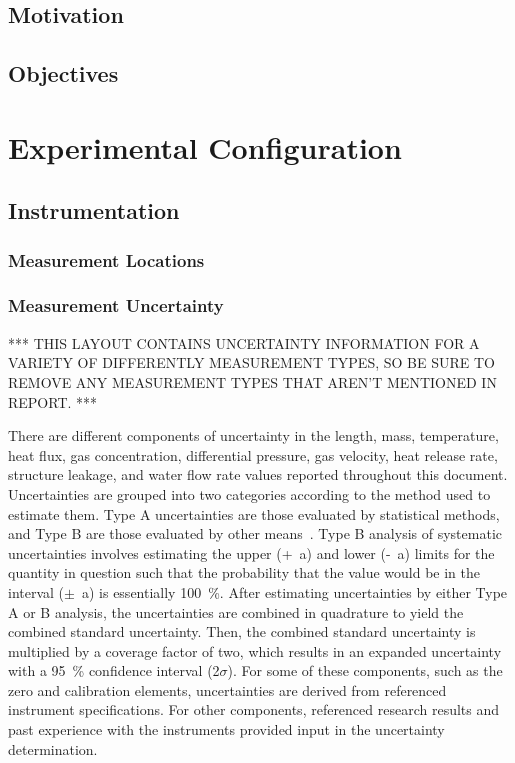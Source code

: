 \documentclass[12pt,oneside]{book}
\begin{document}
\section{Motivation}

\section{Objectives}


\chapter{Experimental Configuration}
\label{chap:exp_config}

\section{Instrumentation}
\label{sec:instrument}

\subsection{Measurement Locations}
\label{subsec:measure_locs}

\subsection{Measurement Uncertainty}
\label{subsec:uncertainty}

*** THIS LAYOUT CONTAINS UNCERTAINTY INFORMATION FOR A VARIETY OF DIFFERENTLY MEASUREMENT TYPES, SO BE SURE TO REMOVE ANY MEASUREMENT TYPES THAT AREN'T MENTIONED IN REPORT. ***

There are different components of uncertainty in the length, mass, temperature, heat flux, gas concentration, differential pressure, gas velocity, heat release rate, structure leakage, and water flow rate values reported throughout this document. Uncertainties are grouped into two categories according to the method used to estimate them. Type A uncertainties are those evaluated by statistical methods, and Type B are those evaluated by other means~\cite{Taylor&Kuyatt:1994}. Type B analysis of systematic uncertainties involves estimating the upper (+~a) and lower (-~a) limits for the quantity in question such that the probability that the value would be in the interval ($\pm$~a) is essentially 100~\%. After estimating uncertainties by either Type A or B analysis, the uncertainties are combined in quadrature to yield the combined standard uncertainty. Then, the combined standard uncertainty is multiplied by a coverage factor of two, which results in an expanded uncertainty with a 95~\% confidence interval (2$\sigma$). For some of these components, such as the zero and calibration elements, uncertainties are derived from referenced instrument specifications. For other components, referenced research results and past experience with the instruments provided input in the uncertainty determination.
\end{document}
